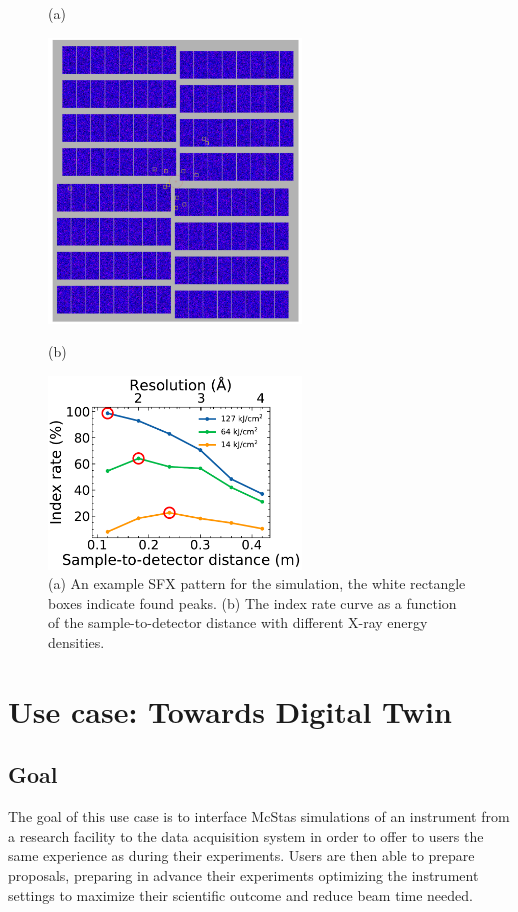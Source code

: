 \documentclass[11pt, a4paper]{article}
\begin{document}
\begin{figure}[H]
\centering
\begin{flushleft}
\LARGE{(a)}
\end{flushleft}
\includegraphics[width=0.6\textwidth]{figures/SFX_pattern.png} \\
\begin{flushleft}
\LARGE{(b)}
\end{flushleft}
\includegraphics[width=0.6\textwidth]{figures/index_rate.pdf} 
\caption{\label{fig:optSim}
(a) An example SFX pattern for the simulation, the white rectangle boxes indicate found peaks. (b) The index rate curve as a function of the sample-to-detector distance with different X-ray energy densities.} 
\end{figure}
\clearpage
\section{Use case: Towards Digital Twin}
\subsection{Goal}
The goal of this use case is to interface McStas simulations of an instrument from a research facility to the data acquisition system in order to offer to users the same experience as during their experiments. Users are then able to prepare proposals, preparing in advance their experiments optimizing the instrument settings to maximize their scientific outcome and reduce beam time needed.
\end{document}

